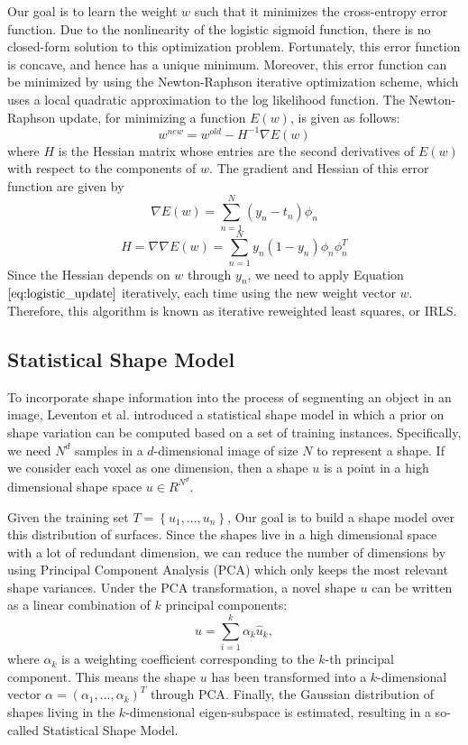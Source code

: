\documentclass{SMBV12}
\begin{document}
Our goal is to learn the weight $w$ such that it minimizes the cross-entropy error function. Due to the nonlinearity of the logistic sigmoid function, there is no closed-form solution to this optimization problem. Fortunately, this error function is concave, and hence has a unique minimum. Moreover, this error function can be minimized by using the Newton-Raphson iterative optimization scheme, which uses a local quadratic approximation to the log likelihood function. The Newton-Raphson update, for minimizing a function $E(w)$, is given as follows:
\begin{equation}
w^{new} = w^{old} - H^{-1} \nabla E(w)
\label{eq:logistic_update}
\end{equation}
where $H$ is the Hessian matrix whose entries are the second derivatives of $E(w)$ with respect to the components of $w$. The gradient and Hessian of this error function are given by
\begin{equation}
\nabla E(w) = \sum\limits_{n = 1}^{N}(y_n - t_n) \phi_n %
\end{equation}
\begin{equation}
H = \nabla \nabla E(w) = \sum\limits_{n = 1}^{N} y_n(1 - y_n) \phi_n \phi_n^T %
\end{equation}
Since the Hessian depends on $w$ through $y_n$, we need to apply Equation $\ref{eq:logistic_update}$ iteratively, each time using the new weight vector $w$. Therefore, this algorithm is known as iterative reweighted least squares, or IRLS.

\subsection{Statistical Shape Model}
\label{sec:SSM}
To incorporate shape information into the process of segmenting an object in an image, Leventon et al. \cite{leventon2000statistical} introduced a statistical shape model in which a prior on shape variation can be computed based on a set of training instances. Specifically, we need $N^d$ samples in a $d$-dimensional image of size $N$ to represent a shape. If we consider each voxel as one dimension, then a shape $u$ is a point in a high dimensional shape space $u \in R^{N^d}$.

Given the training set $T = \left\lbrace u_1, ..., u_n \right\rbrace$, Our goal is to build a shape model over this distribution of surfaces. Since the shapes live in a high dimensional space with a lot of redundant dimension, we can reduce the number of dimensions by using Principal Component Analysis (PCA) which only keeps the most relevant shape variances. Under the PCA transformation, a novel shape $u$ can be written as a linear combination of $k$ principal components:
\begin{equation}
u = \sum\limits_{i = 1}^{k} \alpha_k\hat{u}_k,
\end{equation}
where $\alpha_k$ is a weighting coefficient corresponding to the $k$-th principal component. This means the shape $u$ has been transformed into a $k$-dimensional vector $\alpha = (\alpha_1, ..., \alpha_k)^T$ through PCA. Finally, the Gaussian distribution of shapes living in the $k$-dimensional eigen-subspace is estimated, resulting in a so-called Statistical Shape Model.
\end{document}
